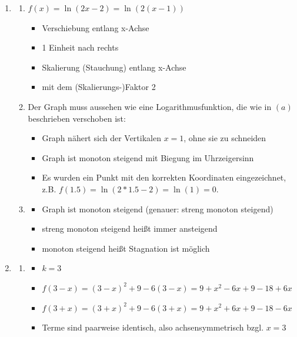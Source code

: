 \documentclass[11pt]{article}
\begin{document}
\begin{enumerate}

\item
\begin{enumerate}
\item $f(x) = \ln(2x-2) = \ln(2(x-1))$
\begin{itemize}
\item Verschiebung entlang x-Achse
\item 1 Einheit nach rechts
\item Skalierung (Stauchung) entlang x-Achse
\item mit dem (Skalierungs-)Faktor 2
\end{itemize}

\item Der Graph muss aussehen wie eine Logarithmusfunktion, die wie in $(a)$ beschrieben verschoben ist:
\begin{itemize}
\item Graph nähert sich der Vertikalen $x=1$, ohne sie zu schneiden
\item Graph ist monoton steigend mit Biegung im Uhrzeigersinn
\item Es wurden ein Punkt mit den korrekten Koordinaten eingezeichnet, z.B. $f(1.5) = \ln(2*1.5-2) = \ln(1) = 0$.
\end{itemize}

\item 
\begin{itemize}
\item Graph ist monoton steigend (genauer: streng monoton steigend)
\item streng monoton steigend heißt immer ansteigend
\item monoton steigend heißt Stagnation ist möglich
\end{itemize}

\end{enumerate}

\item
\begin{enumerate}

\item 
\begin{itemize}
\item $k=3$
\item $f(3-x) = (3-x)^2+9-6(3-x) = 9+x^2-6x+9-18+6x$
\item $f(3+x) = (3+x)^2+9-6(3+x) = 9+x^2+6x+9-18-6x$
\item Terme sind paarweise identisch, also achsensymmetrisch bzgl. $x=3$
\end{itemize}


\end{enumerate}
\end{enumerate}
\end{document}
